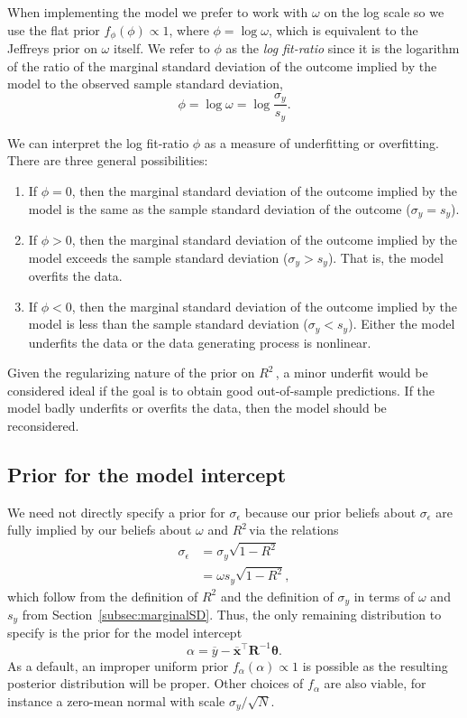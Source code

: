 \documentclass[11pt]{article}
\newcommand{\Rsq}{$R^2\,$}
\newcommand{\boldtheta}{\boldsymbol{\theta}}
\newcommand{\sigmaEps}{\sigma_{\epsilon}}
\newcommand{\R}{\mathbf{R}}
\begin{document}
When implementing the model we prefer to work with $\omega$ on the log scale
so we use the flat prior $f_\phi(\phi) \propto 1$, where $\phi =
\log{\omega}$, which is equivalent to the Jeffreys prior on $\omega$ itself. We
refer to $\phi$ as the \emph{log fit-ratio} since it is the logarithm of the
ratio of the marginal standard deviation of the outcome implied by the model to
the observed sample standard deviation,
%
$$\phi = \log{\omega} = \log{\frac{\sigma_y}{s_y}}.$$

We can interpret the log fit-ratio $\phi$ as a measure of underfitting or overfitting.
There are three general possibilities:

\begin{enumerate}
\item If $\phi = 0$, then the marginal standard deviation of
the outcome implied by the model is the same as the sample standard deviation of
the outcome  ($\sigma_y = s_y$).
\item If $\phi > 0$, then the marginal standard deviation of the outcome implied
by the model exceeds the sample standard deviation ($\sigma_y > s_y$). That is,
the model overfits the data.
\item If $\phi < 0$, then the marginal standard deviation of the outcome implied
by the model is less than the sample standard deviation  ($\sigma_y < s_y$).
Either the model underfits the data or the data generating process is nonlinear.
\end{enumerate}
%
Given the regularizing nature of the prior on \Rsq, a minor underfit would be
considered ideal if the goal is to obtain good out-of-sample predictions. If the
model badly underfits or overfits the data, then the model should be
reconsidered.

\subsection{Prior for the model intercept}
We need not directly specify a prior for $\sigmaEps$ because our prior beliefs
about $\sigmaEps$ are fully implied by our beliefs about $\omega$ and
\Rsq via the relations
%
\begin{align*}
  \sigmaEps
    &= \sigma_y \sqrt{1 - R^2} \\
    & = \omega s_y \sqrt{1 - R^2},
\end{align*}
%
which follow from the definition of $R^2$ and the definition of $\sigma_y$ in
terms of $\omega$ and $s_y$ from Section~\ref{subsec:marginalSD}. Thus, the only
remaining distribution to specify is the prior for the model intercept
$$\alpha = \overline{y} - \overline{\mathbf{x}}^\top \R^{-1} \boldtheta.$$
As a default, an improper uniform prior $f_\alpha(\alpha) \propto 1$ is possible
as the resulting posterior distribution will be proper. Other choices of
$f_\alpha$ are also viable, for instance a zero-mean normal
with scale $\sigma_y / \sqrt{N}$.
\end{document}
